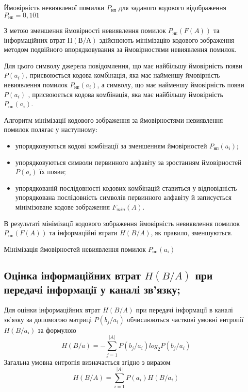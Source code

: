 \documentclass[a4paper,14pt]{extreport}
\begin{document}
Ймовірність невиявленої помилки $P_{\text{нп}}$ для заданого кодового відображення $P_{\text{нп}} =0,101$


З метою зменшення ймовірності невиявлення помилок $P_{\text{нп}} (F(A))$ та інформаційних втрат $Н(В/А)$ здійснюють мінімізацію кодового зображення методом подвійного впорядковування за ймовірностями невиявлення помилок.

Для цього символу джерела повідомлення, що має найбільшу ймовірність появи $P(a_i)$, присвоюється кодова комбінація, яка має найменшу ймовірність невиявлення помилок $P_{\text{нп}} (a_i) $, а символу, що має найменшу ймовірність появи $P(a_i)$ , присвоюється кодова комбінація, яка має найбільшу ймовірність$P_{\text{нп}} (a_i) $.

Алгоритм мінімізації кодового зображення за ймовірностями невиявлення помилок полягає у наступному:
\begin{itemize}
	\item упорядковуються кодові комбінації за зменшенням ймовірностей $P_{\text{нп}} (a_i) $;
	\item упорядковуються символи первинного алфавіту за зростанням
	ймовірностей $P(a_i)$ їх появи;
	\item упорядкованій послідовності кодових комбінацій ставиться у відповідність упорядкована послідовність символів первинного алфавіту й записується мінімізоване кодове зображення $F_{min} (A)$.
\end{itemize}

В результаті мінімізації кодового зображення ймовірність невиявлення
помилок $P_{\text{нп}} (F(A))$ та інформаційні втрати $H(B/A)$, як правило, зменшуються.

\begin{table}[H]
	\caption{Мінімізація ймовірностей невиявлення помилок $P_{\text{нп}}(a_i)$}
	\centering	
		
	\label{table:minimization}
\end{table}

\subsection{Оцінка інформаційних втрат $H(B/A)$ при передачі	інформації у каналі зв'язку;}

Для оцінки інформаційних втрат $H(B/A)$ при передачі інформації в каналі зв'язку за допомогою матриці $P(b_j / a_i)$ обчислюються часткові умовні ентропії $H(B/a_i)$ за формулою
$$H(B/a) = - \sum_{j=1}^{|A|} P(b_j / a_i) log_2 P(b_j / a_i) $$
Загальна умовна ентропія визначається згідно з виразом
$$H(B/A) =  \sum_{i=1}^{|A|} P(a_i)H(B/a_i)$$
\end{document}
